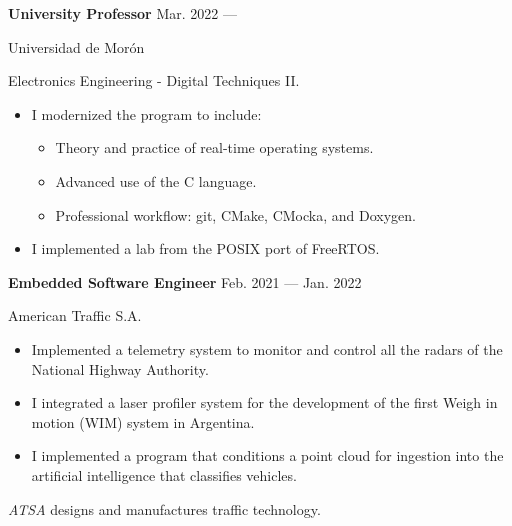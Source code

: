 \bigskip
\parbox[t][][t]{\linewidth}{
	\parbox{\linewidth}{
		\textbf{University Professor}
			\hfill
			{Mar. 2022 --- \phantom{Dec. 2099}}
		}
	\smallbreak
	\parbox{\linewidth}{Universidad de Morón}
	\smallbreak
	Electronics Engineering - Digital Techniques II.
	\begin{itemize}
	    \item{I modernized the program to include:}
		\begin{itemize}
			\item{Theory and practice of real-time operating systems.}
			\item{Advanced use of the C language.}
			\item{Professional workflow: git, CMake, CMocka, and Doxygen.}
		\end{itemize}
		\item{I implemented a lab from the POSIX port of FreeRTOS.}
	\end{itemize}
}

\bigskip
\parbox[t][][t]{\linewidth}{
	\parbox{\linewidth}{
		\textbf{Embedded Software Engineer}
			\hfill
			{Feb. 2021 --- Jan. 2022}
		}
	\smallbreak
	\parbox{\linewidth}{American Traffic S.A.}
	\smallbreak
	\begin{itemize}
	    \item{Implemented a telemetry system to monitor and control all the radars of the National Highway Authority.}
	    \item{I integrated a laser profiler system for the development of the first Weigh in motion (WIM) system in Argentina.}
		\item{I implemented a program that conditions a point cloud for ingestion into the artificial intelligence that classifies vehicles.}
	\end{itemize}
	\smallbreak
    \emph{ATSA} designs and manufactures traffic technology.
}

